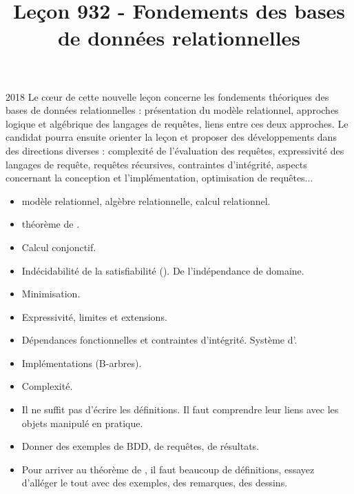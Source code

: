 \documentclass{agregfiche}
\title{Leçon 932 - Fondements des bases de données relationnelles}
\begin{document}
\maketitle

\secrapports
\begin{rapport}{2018}
    Le cœur de cette nouvelle leçon concerne les fondements 
    théoriques des bases de données relationnelles :
    présentation du modèle relationnel, approches logique et 
    algébrique des langages de requêtes, liens entre
    ces deux approches.
    Le candidat pourra ensuite orienter la leçon et proposer des 
    développements dans des directions diverses : complexité de 
    l’évaluation des requêtes, expressivité 
    des langages de requête, requêtes récursives, contraintes 
    d’intégrité, aspects concernant la conception 
    et l’implémentation, optimisation de
    requêtes...
\end{rapport}

\secindispensables

\begin{itemize}
	\item  modèle relationnel, algèbre relationnelle, calcul 
	relationnel.
    \item théorème de .
\end{itemize}

\secasavoir

\begin{itemize}
	\item Calcul conjonctif.
    \item Indécidabilité de la satisfiabilité (). 
    De l'indépendance de domaine.
\end{itemize}

\secidees

\begin{itemize}
    \item Minimisation.
    \item Expressivité, limites et extensions.
	\item Dépendances fonctionnelles et contraintes d'intégrité. 
	Système d'.
    \item Implémentations (B-arbres).
    \item Complexité.
\end{itemize}

\secpieges

\begin{itemize}
	\item Il ne suffit pas d'écrire les définitions. Il faut 
	comprendre leur liens avec les objets manipulé en pratique. 
    \item Donner des exemples de BDD, de requêtes, de résultats.
    \item Pour arriver au théorème de , il faut beaucoup de 
    définitions, essayez d'alléger le tout avec des exemples, des 
    remarques, des dessins.
\end{itemize}
\end{document}
